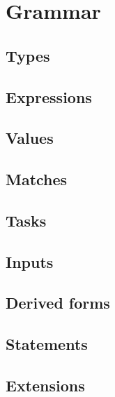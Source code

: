 
\section{Grammar}

\subsection{Types}



\subsection{Expressions}



\subsection{Values}



\subsection{Matches}



\subsection{Tasks}



\subsection{Inputs}



\subsection{Derived forms}



\subsection{Statements}



\subsection{Extensions}

